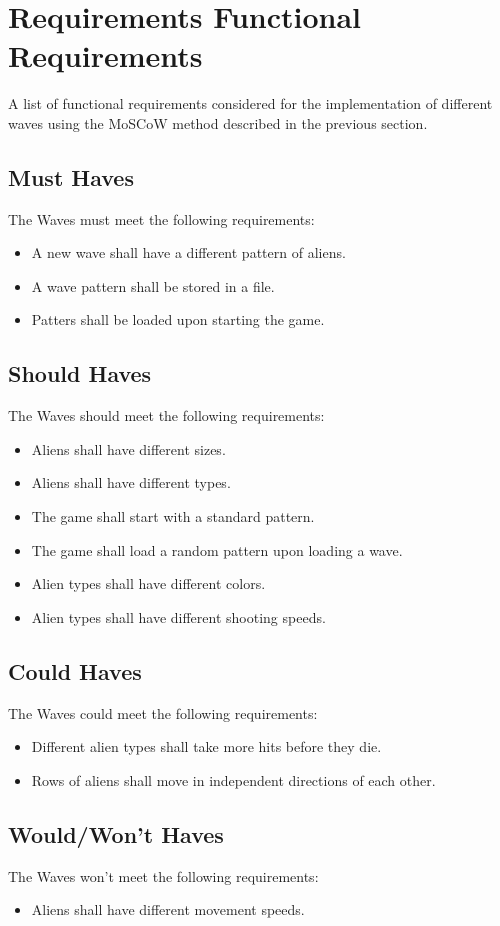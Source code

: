 \section{Requirements Functional Requirements}

A list of functional requirements considered for the implementation of different waves using the MoSCoW method described in the previous section.

\subsection{Must Haves}
The Waves must meet the following requirements:
\begin{itemize}
	\item A new wave shall have a different pattern of aliens.
	\item A wave pattern shall be stored in a file.
	\item Patters shall be loaded upon starting the game.
\end{itemize}

\subsection{Should Haves}
The Waves should meet the following requirements:
\begin{itemize}
	\item Aliens shall have different sizes.
	\item Aliens shall have different types.
	\item The game shall start with a standard pattern. 
	\item The game shall load a random pattern upon loading a wave.
	\item Alien types shall have different colors.
	\item Alien types shall have different shooting speeds.
\end{itemize}

\subsection{Could Haves}
The Waves could meet the following requirements:
\begin{itemize}
	\item Different alien types shall take more hits before they die.
	\item Rows of aliens shall move in independent directions of each other.
\end{itemize}

\subsection{Would/Won't Haves}
The Waves won't meet the following requirements:
\begin{itemize}
	\item Aliens shall have different movement speeds.
\end{itemize}